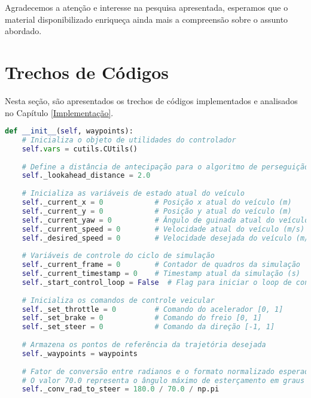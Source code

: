 \documentclass[
	12pt,				%
	oneside, %
	a4paper,			%
	english,			%
	french,				%
	spanish,			%
	brazil				%
	]{abntex2}
\begin{document}
\begin{apendicesenv}
Agradecemos a atenção e interesse na pesquisa apresentada, esperamos que o material disponibilizado enriqueça ainda mais a compreensão sobre o assunto abordado.


\section{Trechos de Códigos}

Nesta seção, são apresentados os trechos de códigos implementados e analisados no Capítulo \ref{Implementação}.


\begin{lstlisting}[language=Python, caption=Construtor da classe Controller2D., label=lst:controller-init]
def __init__(self, waypoints):
    # Inicializa o objeto de utilidades do controlador
    self.vars = cutils.CUtils()
    
    # Define a distância de antecipação para o algoritmo de perseguição pura (em metros)
    self._lookahead_distance = 2.0
    
    # Inicializa as variáveis de estado atual do veículo
    self._current_x = 0            # Posição x atual do veículo (m)
    self._current_y = 0            # Posição y atual do veículo (m)
    self._current_yaw = 0          # Ângulo de guinada atual do veículo (rad)
    self._current_speed = 0        # Velocidade atual do veículo (m/s)
    self._desired_speed = 0        # Velocidade desejada do veículo (m/s)
    
    # Variáveis de controle do ciclo de simulação
    self._current_frame = 0        # Contador de quadros da simulação
    self._current_timestamp = 0    # Timestamp atual da simulação (s)
    self._start_control_loop = False  # Flag para iniciar o loop de controle
    
    # Inicializa os comandos de controle veicular
    self._set_throttle = 0         # Comando do acelerador [0, 1]
    self._set_brake = 0            # Comando do freio [0, 1]
    self._set_steer = 0            # Comando da direção [-1, 1]
    
    # Armazena os pontos de referência da trajetória desejada
    self._waypoints = waypoints
    
    # Fator de conversão entre radianos e o formato normalizado esperado pelo simulador
    # O valor 70.0 representa o ângulo máximo de esterçamento em graus
    self._conv_rad_to_steer = 180.0 / 70.0 / np.pi
    

\end{lstlisting}
\end{apendicesenv}
\end{document}
